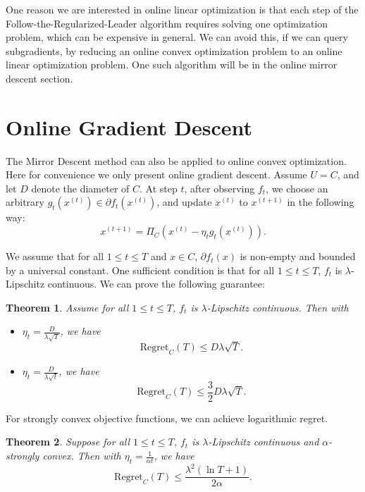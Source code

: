 \documentclass[openany]{book}
\newtheorem{theorem}{Theorem}[chapter]
\theoremstyle{definition}
\theoremstyle{remark}
\begin{document}
One reason we are interested in online linear optimization is that each step of the Follow-the-Regularized-Leader algorithm requires solving one optimization problem, which can be expensive in general. We can avoid this, if we can query subgradients, by reducing an online convex optimization problem to an online linear optimization problem. One such algorithm will be in the online mirror descent section.

\section{Online Gradient Descent}
The Mirror Descent method can also be applied to online convex optimization. Here for convenience we only present online gradient descent. Assume $U=C$, and let $D$ denote the diameter of $C$. At step $t$, after observing $f_t$, we choose an arbitrary $g_t(x^{(t)})\in\partial f_t(x^{(t)})$, and update $x^{(t)}$ to $x^{(t+1)}$ in the following way:
\begin{equation}\label{onlineSubgradUpdate}
    x^{(t+1)}=\Pi_C(x^{(t)}-\eta_tg_t(x^{(t)})).
\end{equation}

We assume that for all $1\le t\le T$ and $x\in C$, $\partial f_t(x)$ is non-empty and bounded by a universal constant. One sufficient condition is that for all $1\le t\le T$, $f_t$ is $\lambda$-Lipschitz continuous. We can prove the following guarantee:
\begin{theorem}
    Assume for all $1\le t\le T$, $f_t$ is $\lambda$-Lipschitz continuous. Then with
    \begin{itemize}
        \item $\eta_t=\frac{D}{\lambda\sqrt{T}}$, we have
        \begin{equation}
            \mathrm{Regret}_C(T)\le D\lambda\sqrt{T}.
        \end{equation}
        \item $\eta_t=\frac{D}{\lambda\sqrt{t}}$, we have
        \begin{equation}
            \mathrm{Regret}_C(T)\le \frac{3}{2}D\lambda\sqrt{T}.
        \end{equation}
    \end{itemize}
\end{theorem}

For strongly convex objective functions, we can achieve logarithmic regret.
\begin{theorem}
    Suppose for all $1\le t\le T$, $f_t$ is $\lambda$-Lipschitz continuous and $\alpha$-strongly convex. Then with $\eta_t=\frac{1}{\alpha t}$, we have
    \begin{equation}
        \mathrm{Regret}_C(T)\le \frac{\lambda^2(\ln T+1)}{2\alpha}.
    \end{equation}
\end{theorem}
\end{document}
